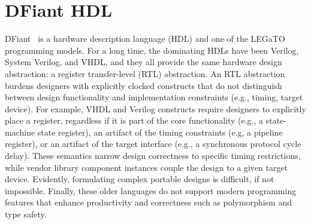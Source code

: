 \section{DFiant HDL}
DFiant~\cite{Port2017} is a hardware description language (HDL) and one of the LEGaTO programming models. For a long time, the dominating HDLs have been Verilog, System Verilog, and VHDL, and they all provide the same hardware design abstraction: a register transfer-level (RTL) abstraction. An RTL abstraction burdens designers with explicitly clocked constructs that do not distinguish between design functionality and implementation constraints (e.g., timing, target device).
For example, VHDL and Verilog constructs require designers to explicitly place a register, regardless if it is part of the core functionality (e.g., a state-machine state register), an artifact of the timing constraints (e.g, a pipeline register), or an artifact of the target interface (e.g., a synchronous protocol cycle delay). These semantics narrow design correctness to specific timing restrictions, while vendor library component instances couple the design to a given target device. Evidently, formulating complex portable designs is difficult, if not impossible. Finally, these older languages do not support modern programming features that enhance productivity and correctness such as polymorphism and type safety.








%
%

